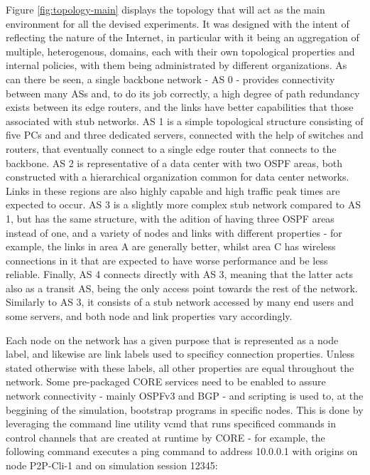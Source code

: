     Figure \ref{fig:topology-main} displays the topology that will act as the main environment for all the devised experiments.
    It was designed with the intent of reflecting the nature of the Internet, in particular with it being an aggregation of multiple, heterogenous, domains, each with their own topological properties and internal policies, with them being administrated by different organizations.
    As can there be seen, a single backbone network - AS 0 - provides connectivity between many ASs and, to do its job correctly, a high degree of path redundancy exists between its edge routers, and the links have better capabilities that those associated with stub networks.
    AS 1 is a simple topological structure consisting of five PCs and and three dedicated servers, connected with the help of switches and routers, that eventually connect to a single edge router that connects to the backbone.
    AS 2 is representative of a data center with two OSPF areas, both constructed with a hierarchical organization common for data center networks.
    Links in these regions are also highly capable and high traffic peak times are expected to occur.
    AS 3 is a slightly more complex stub network compared to AS 1, but has the same structure, with the adition of having three OSPF areas instead of one, and a variety of nodes and links with different properties - for example, the links in area A are generally better, whilst area C has wireless connections in it that are expected to have worse performance and be less reliable.
    Finally, AS 4 connects directly with AS 3, meaning that the latter acts also as a transit AS, being the only access point towards the rest of the network.
    Similarly to AS 3, it consists of a stub network accessed by many end users and some servers, and both node and link properties vary accordingly.

    Each node on the network has a given purpose that is represented as a node label, and likewise are link labels used to specificy connection properties.
    Unless stated otherwise with these labels, all other properties are equal throughout the network.
    Some pre-packaged CORE services need to be enabled to assure network connectivity - mainly OSPFv3 and BGP - and scripting is used to, at the beggining of the simulation, bootstrap programs in specific nodes.
    This is done by leveraging the command line utility vcmd that runs specificed commands in control channels that are created at runtime by CORE - for example, the following command executes a ping command to address 10.0.0.1 with origins on node P2P-Cli-1 and on simulation session 12345:

